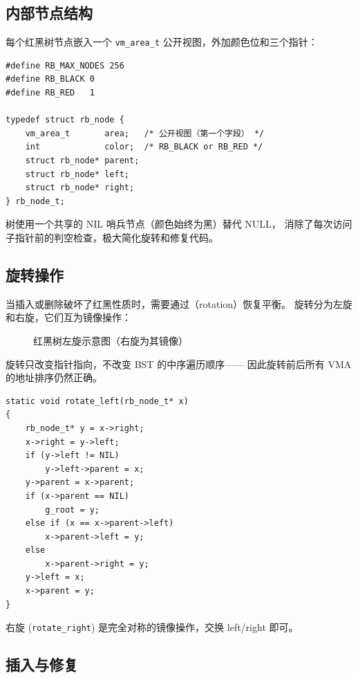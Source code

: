 \subsection{内部节点结构}

每个红黑树节点嵌入一个 \texttt{vm\_area\_t} 公开视图，外加颜色位和三个指针：

\begin{lstlisting}[style=cstyle]
#define RB_MAX_NODES 256
#define RB_BLACK 0
#define RB_RED   1

typedef struct rb_node {
    vm_area_t       area;   /* 公开视图（第一个字段） */
    int             color;  /* RB_BLACK or RB_RED */
    struct rb_node* parent;
    struct rb_node* left;
    struct rb_node* right;
} rb_node_t;
\end{lstlisting}

树使用一个共享的 NIL 哨兵节点（颜色始终为黑）替代 NULL，
消除了每次访问子指针前的判空检查，极大简化旋转和修复代码。

\subsection{旋转操作}

当插入或删除破坏了红黑性质时，需要通过（rotation）恢复平衡。
旋转分为左旋和右旋，它们互为镜像操作：

\begin{figure}[H]
  \centering
  
  \caption{红黑树左旋示意图（右旋为其镜像）}
  \label{fig:rbtree-rotate}
\end{figure}

旋转只改变指针指向，不改变 BST 的中序遍历顺序——
因此旋转前后所有 VMA 的地址排序仍然正确。

\begin{lstlisting}[style=cstyle]
static void rotate_left(rb_node_t* x)
{
    rb_node_t* y = x->right;
    x->right = y->left;
    if (y->left != NIL)
        y->left->parent = x;
    y->parent = x->parent;
    if (x->parent == NIL)
        g_root = y;
    else if (x == x->parent->left)
        x->parent->left = y;
    else
        x->parent->right = y;
    y->left = x;
    x->parent = y;
}
\end{lstlisting}

右旋 (\texttt{rotate\_right}) 是完全对称的镜像操作，交换 left/right 即可。

\subsection{插入与修复}

